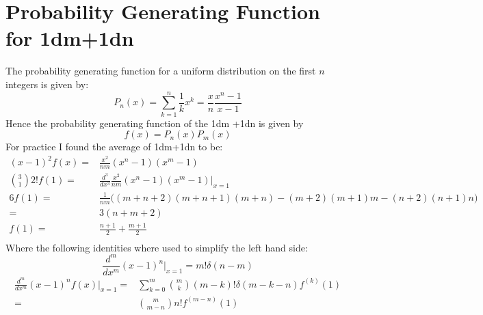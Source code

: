 
\section{Probability Generating Function for 1dm+1dn}
The probability generating function for a uniform distribution on the first $n$ integers is given by:
\[P_n(x) = \sum_{k=1}^{n}\frac{1}{k}x^k = \frac{x}{n}\frac{x^n-1}{x-1}\]
Hence the probability generating function of the 1dm +1dn is given by 
\[f(x) = P_n(x)P_m(x)\]
For practice I found the average of 1dm+1dn to be:
\begin{equation*}
\begin{aligned}
	(x-1)^2f(x) =& \frac{x^2}{nm}(x^n-1)(x^m-1) \\
	\binom{3}{1}2!f(1) =& \frac{d^3}{d x^3} \frac{x^2}{nm}(x^n-1)(x^m-1) \bigg|_{x=1} \\
	6f(1) =& \frac{1}{nm}\bigg((m+n+2)(m+n+1)(m+n)-(m+2)(m+1)m-(n+2)(n+1)n\bigg) \\
	=& 3(n+m+2) \\
	f(1) =& \frac{n+1}{2}+\frac{m+1}{2} \\
\end{aligned}
\end{equation*}
Where the following identities where used to simplify the left hand side:
\[\frac{d^m}{d x^m}(x-1)^n\bigg|_{x=1} = m!\delta(n-m)\]
\begin{equation*}
\begin{aligned}
	\frac{d^m}{d x^m}(x-1)^nf(x)\bigg|_{x=1} =& \sum_{k=0}^{m}\binom{m}{k}(m-k)!\delta(m-k-n)f^{(k)}(1)\\
	=&\binom{m}{m-n}n!f^{(m-n)}(1)\\
\end{aligned}
\end{equation*}

